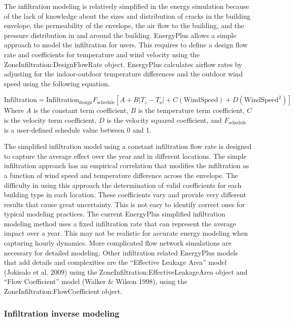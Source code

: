The infiltration modeling is relatively simplified in the energy simulation because of the lack of knowledge about the sizes and distribution of cracks in the building envelope, the permeability of the envelope, the air flow to the building, and the pressure distribution in and around the building. EnergyPlus allows a simple approach to model the infiltration for users. This requires to define a design flow rate and coefficients for temperature and wind velocity using the ZoneInfiltration:DesignFlowRate object. EnergyPlus calculates airflow rates by adjusting for the indoor-outdoor temperature differences and the outdoor wind speed using the following equation.

\begin{equation}
\text{Infiltration} = \text{Infiltration}_\text{design} F_\text{schedule} \left[A+B|T_z -T_o|+C (\text{WindSpeed})+D(\text{WindSpeed}^2 )\right]
\end{equation}
Where $A$ is the constant term coefficient, $B$ is the temperature term coefficient, $C$ is the velocity term coefficient, $D$ is the velocity squared coefficient, and $F_\text{schedule}$ is a user-defined schedule value between 0 and 1.

The simplified infiltration model using a constant infiltration flow rate is designed to capture the average effect over the year and in different locations. The simple infiltration approach has an empirical correlation that modifies the infiltration as a function of wind speed and temperature difference across the envelope. The difficulty in using this approach the determination of valid coefficients for each building type in each location. These coefficients vary and provide very different results that cause great uncertainty. This is not easy to identify correct ones for typical modeling practices. The current EnergyPlus simplified infiltration modeling method uses a fixed infiltration rate that can represent the average impact over a year. This may not be realistic for accurate energy modeling when capturing hourly dynamics. More complicated flow network simulations are necessary for detailed modeling. Other infiltration related EnergyPlus models that add details and complexities are the ``Effective Leakage Area'' model (Jokisalo et al. 2009) using the ZoneInfiltration:EffectiveLeakageArea object  and ``Flow Coefficient'' model (Walker \& Wilson 1998), using the ZoneInfiltration:FlowCoefficient object.

\subsubsection{Infiltration inverse modeling}\label{Infiltration inverse modeling}

